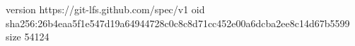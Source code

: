 version https://git-lfs.github.com/spec/v1
oid sha256:26b4eaa5f1e547d19a64944728c0c8c8d71cc452e00a6dcba2ee8c14d67b5599
size 54124
